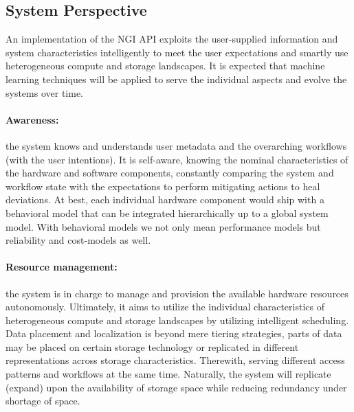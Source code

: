 \documentclass[a4paper, twocolumn]{article}
\begin{document}
\subsection{System Perspective}

An implementation of the NGI API exploits the user-supplied information and system characteristics intelligently to meet the user expectations and smartly use heterogeneous compute and storage landscapes.
It is expected that machine learning techniques will be applied to serve the individual aspects and evolve the systems over time.

\paragraph{Awareness:}
the system knows and understands user metadata and the overarching workflows (with the user intentions).
It is self-aware, knowing the nominal characteristics of the hardware and software components, constantly comparing the system and workflow state with the expectations to perform mitigating actions to heal deviations.
At best, each individual hardware component would ship with a behavioral model that can be integrated hierarchically up to a global system model.
With behavioral models we not only mean performance models but reliability and cost-models as well.

\paragraph{Resource management:}
the system is in charge to manage and provision the available hardware resources autonomously.
Ultimately, it aims to utilize the individual characteristics of heterogeneous compute and storage landscapes by utilizing intelligent scheduling.
Data placement and localization is beyond mere tiering strategies, parts of data may be placed on certain storage technology or replicated in different representations across storage characteristics.
Therewith, serving different access patterns and workflows at the same time.
Naturally, the system will replicate (expand) upon the availability of storage space while reducing redundancy under shortage of space.
\end{document}
